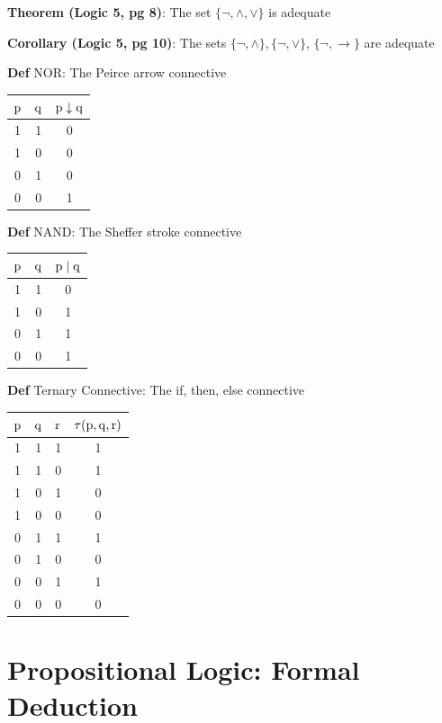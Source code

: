 \documentclass[11pt,notitlepage]{report}
\newcommand{\tbf}[1]{\textbf{#1}}
\begin{document}
\tbf{Theorem (Logic 5, pg 8)}: The set $\{\neg, \wedge, \vee\}$ is adequate

\tbf{Corollary (Logic 5, pg 10)}: The sets $\{\neg, \wedge\}, \{\neg, \vee\}$, $\{\neg, \to\}$ are adequate

\textbf{Def} NOR: The Peirce arrow connective
\begin{center}
\begin{tabular}{ |c|c || c| } 
 \hline
 $\rm p$ & $\rm q$ & $\rm p \downarrow \rm q$ \\ 
 \hline
 1 & 1 & 0 \\ 
 1 & 0 & 0 \\ 
 0 & 1 & 0 \\ 
 0 & 0 & 1 \\ 
 \hline
\end{tabular}
\end{center}

\textbf{Def} NAND: The Sheffer stroke connective
\begin{center}
\begin{tabular}{ |c|c || c| } 
 \hline
 $\rm p$ & $\rm q$ & $\rm p \mid \rm q$ \\ 
 \hline
 1 & 1 & 0 \\ 
 1 & 0 & 1 \\ 
 0 & 1 & 1 \\ 
 0 & 0 & 1 \\ 
 \hline
\end{tabular}
\end{center}

\textbf{Def} Ternary Connective: The if, then, else connective
\begin{center}
\begin{tabular}{ |c|c|c || c| } 
 \hline
 $\rm p$ & $\rm q$ & $\rm r$ & $\tau(\rm p, \rm q, r)$ \\ 
 \hline
 1 & 1 & 1 & 1\\ 
 1 & 1 & 0 & 1\\ 
 1 & 0 & 1 & 0\\ 
 1 & 0 & 0 & 0\\ 
 0 & 1 & 1 & 1\\ 
 0 & 1 & 0 & 0\\ 
 0 & 0 & 1 & 1\\ 
 0 & 0 & 0 & 0\\ 
 \hline
\end{tabular}
\end{center}

\section{Propositional Logic: Formal Deduction}
\end{document}
